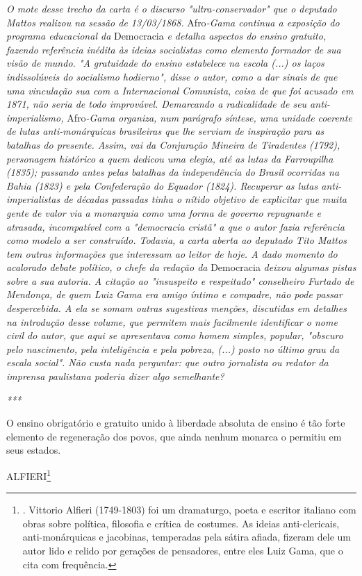 \emph{O mote desse trecho da carta é o discurso "ultra-conservador" que
o deputado Mattos realizou na sessão de 13/03/1868.} Afro\emph{-Gama
continua a exposição do programa educacional da} Democracia \emph{e
detalha aspectos do ensino gratuito, fazendo referência inédita às
ideias socialistas como elemento formador de sua visão de mundo. "A
gratuidade do ensino estabelece na escola (...) os laços indissolúveis
do socialismo hodierno", disse o autor, como a dar sinais de que uma
vinculação sua com a Internacional Comunista, coisa de que foi acusado
em 1871, não seria de todo improvável. Demarcando a radicalidade de seu
anti-imperialismo,} Afro\emph{-Gama organiza, num parágrafo síntese, uma
unidade coerente de lutas anti-monárquicas brasileiras que lhe serviam
de inspiração para as batalhas do presente. Assim, vai da Conjuração
Mineira de Tiradentes (1792), personagem histórico a quem dedicou uma
elegia, até as lutas da Farroupilha (1835); passando antes pelas
batalhas da independência do Brasil ocorridas na Bahia (1823) e pela
Confederação do Equador (1824). Recuperar as lutas anti-imperialistas de
décadas passadas tinha o nítido objetivo de explicitar que muita gente
de valor via a monarquia como uma forma de governo repugnante e
atrasada, incompatível com a "democracia cristã" a que o autor fazia
referência como modelo a ser construído. Todavia, a carta aberta ao
deputado Tito Mattos tem outras informações que interessam ao leitor de
hoje. A dado momento do acalorado debate político, o chefe da redação
da} Democracia \emph{deixou algumas pistas sobre a sua autoria. A
citação ao "insuspeito e respeitado" conselheiro Furtado de Mendonça, de
quem Luiz Gama era amigo íntimo e compadre, não pode passar
despercebida. A ela se somam outras sugestivas menções, discutidas em
detalhes na introdução desse volume, que permitem mais facilmente
identificar o nome civil do autor, que aqui se apresentava como homem
simples, popular, "obscuro pelo nascimento, pela inteligência e pela
pobreza, (...) posto no último grau da escala social". Não custa nada
perguntar: que outro jornalista ou redator da imprensa paulistana
poderia dizer algo semelhante?}

\emph{***}

O ensino obrigatório e gratuito unido à liberdade absoluta de ensino é
tão forte elemento de regeneração dos povos, que ainda nenhum monarca o
permitiu em seus estados.

ALFIERI\footnote{. Vittorio Alfieri (1749-1803) foi um dramaturgo, poeta
  e escritor italiano com obras sobre política, filosofia e crítica de
  costumes. As ideias anti-clericais, anti-monárquicas e jacobinas,
  temperadas pela sátira afiada, fizeram dele um autor lido e relido por
  gerações de pensadores, entre eles Luiz Gama, que o cita com
  frequência.}

